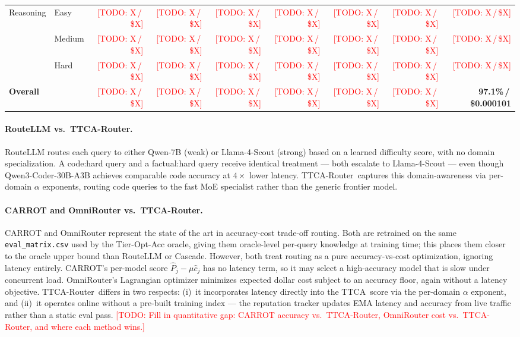 \documentclass[11pt]{article}
\newcommand{\sysname}{TTCA-Router\xspace}
\newcommand{\ttca}{\textsc{TTCA}\xspace}
\newcommand{\result}[1]{\textbf{#1}}
\newcommand{\todo}[1]{\textcolor{red}{[TODO: #1]}}
\begin{document}
\begin{table}[t]
{\begin{tabular}{llrrrrrrr}
    \midrule
    \multirow{3}{*}{Reasoning}
      & Easy   & \todo{X\,/\,\$X} & \todo{X\,/\,\$X} & \todo{X\,/\,\$X} & \todo{X\,/\,\$X} & \todo{X\,/\,\$X} & \todo{X\,/\,\$X} & \todo{X\,/\,\$X} \\
      & Medium & \todo{X\,/\,\$X} & \todo{X\,/\,\$X} & \todo{X\,/\,\$X} & \todo{X\,/\,\$X} & \todo{X\,/\,\$X} & \todo{X\,/\,\$X} & \todo{X\,/\,\$X} \\
      & Hard   & \todo{X\,/\,\$X} & \todo{X\,/\,\$X} & \todo{X\,/\,\$X} & \todo{X\,/\,\$X} & \todo{X\,/\,\$X} & \todo{X\,/\,\$X} & \todo{X\,/\,\$X} \\
    \midrule
    \multicolumn{2}{l}{\textbf{Overall}}
      & \todo{X\,/\,\$X} & \todo{X\,/\,\$X} & \todo{X\,/\,\$X} & \todo{X\,/\,\$X} & \todo{X\,/\,\$X} & \todo{X\,/\,\$X} & \result{97.1\%\,/\,\$0.000101} \\
    \bottomrule
  \end{tabular}}
\end{table}

\paragraph{RouteLLM vs.\ \sysname.}
RouteLLM routes each query to either Qwen-7B (weak) or Llama-4-Scout
(strong) based on a learned difficulty score, with no domain
specialization.  A code:hard query and a factual:hard query receive
identical treatment — both escalate to Llama-4-Scout — even though
Qwen3-Coder-30B-A3B achieves comparable code accuracy at
\result{$4\times$} lower latency.
\sysname\ captures this domain-awareness via per-domain $\alpha$
exponents, routing code queries to the fast MoE specialist rather
than the generic frontier model.

\paragraph{CARROT and OmniRouter vs.\ \sysname.}
CARROT and OmniRouter represent the state of the art in
accuracy-cost trade-off routing.  Both are retrained on the same
\texttt{eval\_matrix.csv} used by the Tier-Opt-Acc oracle, giving
them oracle-level per-query knowledge at training time; this places
them closer to the oracle upper bound than RouteLLM or Cascade.
However, both treat routing as a pure accuracy-vs-cost optimization,
ignoring latency entirely.
CARROT's per-model score $\hat{P}_j - \mu\hat{c}_j$ has no latency
term, so it may select a high-accuracy model that is slow under
concurrent load.
OmniRouter's Lagrangian optimizer minimizes expected dollar cost
subject to an accuracy floor, again without a latency objective.
\sysname\ differs in two respects:
(i)~it incorporates latency directly into the \ttca\ score via the
per-domain $\alpha$ exponent, and
(ii)~it operates online without a pre-built training index —
the reputation tracker updates EMA latency and accuracy from live
traffic rather than a static eval pass.
\todo{Fill in quantitative gap: CARROT accuracy vs.\ \sysname,
OmniRouter cost vs.\ \sysname, and where each method wins.}
\end{document}
